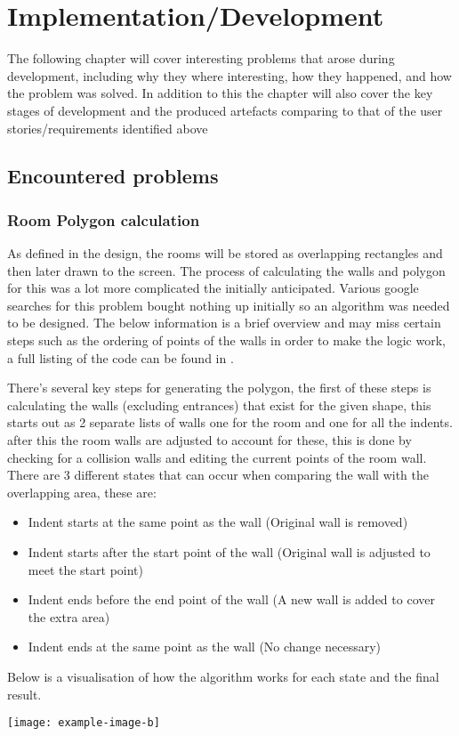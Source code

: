 \section{Implementation/Development}
The following chapter will cover interesting problems that arose during development, including why they where interesting, how they happened, and how the problem was solved. In addition to this the chapter will also cover the key stages of development and the produced artefacts comparing to that of the user stories/requirements identified above

\subsection{Encountered problems} %
\subsubsection{Room Polygon calculation}
As defined in the design, the rooms will be stored as overlapping rectangles and then later drawn to the screen. The process of calculating the walls and polygon for this was a lot more complicated the initially anticipated. Various google searches for this problem bought nothing up initially so an algorithm was needed to be designed. The below information is a brief overview and may miss certain steps such as the ordering of points of the walls in order to make the logic work, a full listing of the code can be found in \appendixtemp.

There's several key steps for generating the polygon, the first of these steps is calculating the walls (excluding entrances) that exist for the given shape, this starts out as 2 separate lists of walls one for the room and one for all the indents. after this the room walls are adjusted to account for these, this is done by checking for a collision walls and editing the current points of the room wall. There are 3 different states that can occur when comparing the wall with the overlapping area, these are:
\begin{itemize}
	\item Indent starts at the same point as the wall (Original wall is removed)
	\item Indent starts after the start point of the wall (Original wall is adjusted to meet the start point)
	\item Indent ends before the end point of the wall (A new wall is added to cover the extra area)
	\item Indent ends at the same point as the wall (No change necessary)
	
\end{itemize}
Below is a visualisation of how the algorithm works for each state and the final result.
\begin{center}
	\texttt{[image: example-image-b]}
\end{center}

